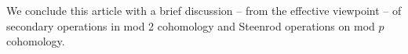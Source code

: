 We conclude this article with a brief discussion -- from the effective viewpoint -- of secondary operations in mod 2 cohomology and Steenrod operations on mod $p$ cohomology.


%


